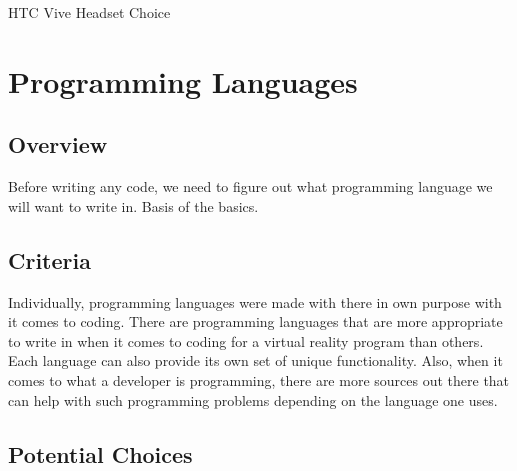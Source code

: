 \documentclass[letterpaper,10pt,onecolumn,compsoc]{IEEEtran}
\begin{document}
\begin{center}
HTC Vive Headset Choice
\end{center}

\newpage

\section{Programming Languages}
\subsection{Overview}

\noindent
Before writing any code, we need to figure out what programming language we will want to write in. Basis of the basics.

\subsection{Criteria}


\noindent
Individually, programming languages were made with there in own purpose with it comes to coding. There are programming languages that are more appropriate to write in when it comes to coding for a virtual reality program than others. Each language can also provide its own set of unique functionality. Also, when it comes to what a developer is programming, there are more sources out there that can help with such programming problems depending on the language one uses.

\subsection{Potential Choices}
\end{document}
